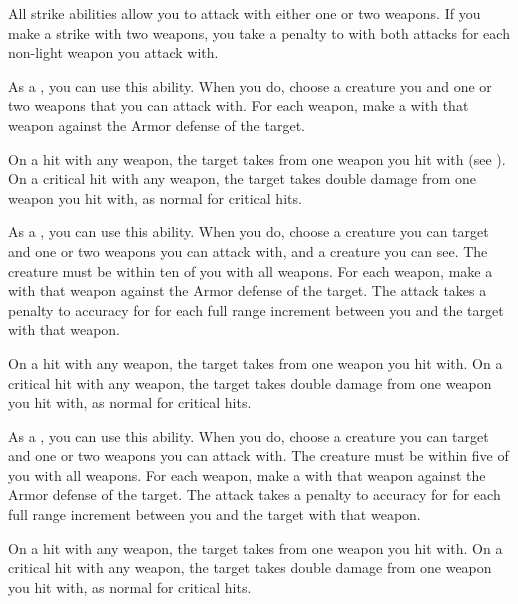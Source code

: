         \label{Two-Weapon Strikes}
        All strike abilities allow you to attack with either one or two weapons.
        If you make a strike with two weapons, you take a  penalty to  with both attacks for each non-light weapon you attack with.

        \begin{ability}{}
            As a , you can use this ability.
            When you do, choose a creature you  and one or two  weapons that you can attack with.
            For each weapon, make a  with that weapon against the Armor defense of the target.

            On a hit with any weapon, the target takes  from one weapon you hit with (see ).
            On a critical hit with any weapon, the target takes double damage from one weapon you hit with, as normal for critical hits.
        \end{ability}

        \begin{ability}{}
            As a , you can use this ability.
            When you do, choose a creature you can target and one or two  weapons you can attack with, and a creature you can see.
            The creature must be within ten  of you with all weapons.
            For each weapon, make a  with that weapon against the Armor defense of the target.
            The attack takes a  penalty to accuracy for for each full range increment between you and the target with that weapon.

            On a hit with any weapon, the target takes  from one weapon you hit with.
            On a critical hit with any weapon, the target takes double damage from one weapon you hit with, as normal for critical hits.
        \end{ability}

        \begin{ability}{}
            As a , you can use this ability.
            When you do, choose a creature you can target and one or two  weapons you can attack with.
            The creature must be within five  of you with all weapons.
            For each weapon, make a  with that weapon against the Armor defense of the target.
            The attack takes a  penalty to accuracy for for each full range increment between you and the target with that weapon.

            On a hit with any weapon, the target takes  from one weapon you hit with.
            On a critical hit with any weapon, the target takes double damage from one weapon you hit with, as normal for critical hits.
        \end{ability}

